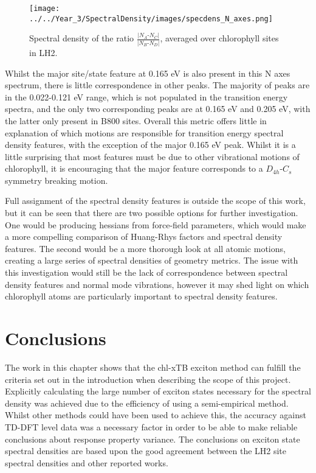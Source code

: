 \begin{figure}
    \centering
    \texttt{[image: ../../Year\_3/SpectralDensity/images/specdens\_N\_axes.png]}
    \caption{Spectral density of the ratio $\frac{\left\lvert N_A\text{-}N_C \right\rvert}{\left\lvert N_B\text{-}N_D \right\rvert}$,
    averaged over chlorophyll sites in LH2.}
    \label{fig:specdens_N_axes}
\end{figure}

Whilst the major site/state feature at 0.165 eV is also present in this N axes spectrum,
there is little correspondence in other peaks. The majority of peaks are in the 
0.022-0.121 eV range, which is not populated in the transition energy spectra, and
the only two corresponding peaks are at 0.165 eV and 0.205 eV, with the latter only
present in B800 sites. Overall this metric offers little in explanation of which
motions are responsible for transition energy spectral density features, with the
exception of the major 0.165 eV peak. Whilst it is a little surprising that most 
features must be due to other vibrational motions of chlorophyll, it is encouraging 
that the major feature corresponds to a $D_{4h}$-$C_{s}$ symmetry breaking motion. 

Full assignment of the spectral density features is outside the scope of this work,
but it can be seen that there are two possible options for further investigation.
One would be producing hessians from force-field parameters, which would make a more
compelling comparison of Huang-Rhys factors and spectral density features. The second
would be a more thorough look at all atomic motions, creating a large series of 
spectral densities of geometry metrics. The issue with this investigation would 
still be the lack of correspondence between spectral density features and normal
mode vibrations, however it may shed light on which chlorophyll atoms are particularly
important to spectral density features.

\section{Conclusions}
\label{sec:specdens_concs}

The work in this chapter shows that the chl-xTB exciton method can fulfill the criteria
set out in the introduction when describing the scope of this project. Explicitly 
calculating the large number of exciton states necessary for the spectral density 
was achieved  due to the efficiency of using a semi-empirical method. Whilst other 
methods could have been used to achieve this, the accuracy against TD-DFT level 
data was a necessary factor in order to be able to make reliable conclusions about 
response property variance. The conclusions on exciton state spectral densities 
are based upon the good agreement between the LH2 site spectral densities and other 
reported works.

